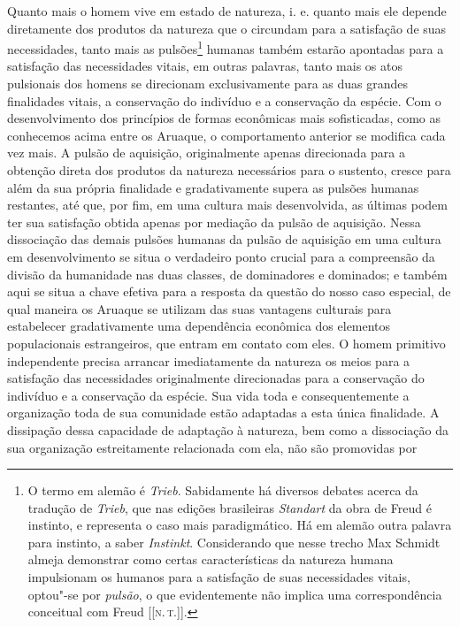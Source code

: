 Quanto mais o homem vive em estado de natureza, i. e. quanto mais ele
depende diretamente dos produtos da natureza que o circundam para a
satisfação de suas necessidades, tanto mais as pulsões\footnote{O termo em alemão é \textit{Trieb}. Sabidamente há diversos debates
  acerca da tradução de \textit{Trieb}, que nas edições brasileiras
  \textit{Standart} da obra de Freud é instinto, e representa o caso mais
  paradigmático. Há em alemão outra palavra para instinto, a saber
  \textit{Instinkt}. Considerando que nesse trecho Max Schmidt almeja
  demonstrar como certas características da natureza humana impulsionam os
  humanos para a satisfação de suas necessidades vitais, optou"-se por
  \textit{pulsão}, o que evidentemente não implica uma correspondência
  conceitual com Freud {[}{[}\textsc{n.\,t.}{]}{]}.} humanas também
estarão apontadas para a satisfação das necessidades vitais, em outras
palavras, tanto mais os atos pulsionais dos homens se direcionam
exclusivamente para as duas grandes finalidades vitais, a conservação
do indivíduo e a conservação da espécie. Com o desenvolvimento dos
princípios de formas econômicas mais sofisticadas, como as conhecemos
acima entre os Aruaque, o comportamento anterior se modifica cada vez
mais. A pulsão de aquisição, originalmente apenas direcionada para a
obtenção direta dos produtos da natureza necessários para o sustento,
cresce para além da sua própria finalidade e gradativamente supera as
pulsões humanas restantes, até que, por fim, em uma cultura mais
desenvolvida, as últimas podem ter sua satisfação obtida apenas por
mediação da pulsão de aquisição. Nessa dissociação das demais pulsões
humanas da pulsão de aquisição em uma cultura em desenvolvimento se
situa o verdadeiro ponto crucial para a compreensão da divisão da
humanidade nas duas classes, de dominadores e dominados; e também aqui
se situa a chave efetiva para a resposta da questão do nosso caso
especial, de qual maneira os Aruaque se utilizam das suas vantagens
culturais para estabelecer gradativamente uma dependência econômica
dos elementos populacionais estrangeiros, que entram em contato com
eles. O homem primitivo independente precisa arrancar imediatamente da
natureza os meios para a satisfação das necessidades originalmente
direcionadas para a conservação do indivíduo e a conservação da
espécie. Sua vida toda e consequentemente a organização toda de sua
comunidade estão adaptadas a esta única finalidade. A dissipação dessa
capacidade de adaptação à natureza, bem como a dissociação da sua
organização estreitamente relacionada com ela, não são promovidas por
